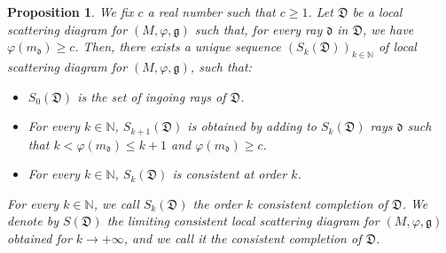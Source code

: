 \documentclass[12pt, a4paper]{amsart}
\newtheorem{prop}[defn]{Proposition}
\newcommand\NN{\mathbb N}
\newcommand\fd{\mathfrak d}
\newcommand\fD{\mathfrak D}
\newcommand\fg{\mathfrak g}
\begin{document}
\begin{prop} \label{prop_local_consistent_completion}
We fix $c$ a real number such that $c \geqslant 1$.
Let $\fD$ be a local scattering diagram for 
$(M,\varphi,\fg)$ such that, for every ray $\fd$ in $\fD$, we have $\varphi(m_\fd) \geqslant c$. Then, there exists a unique sequence 
$(S_k(\fD))_{k \in \NN}$ of local scattering diagram
for $(M,\varphi,\fg)$,
such that:
\begin{itemize}
\item[(i)] $S_0(\fD)$ is the set of ingoing rays of $\fD$.
\item[(ii)] For every $k \in \NN$, $S_{k+1}(\fD)$ is obtained by adding to $S_k(\fD)$ rays 
$\fd$ such that $k<\varphi(m_\fd) \leqslant k+1$ and $\varphi(m_\fd) \geqslant c$.
\item[(iii)] For every $k \in \NN$, 
$S_k(\fD)$ is consistent at order $k$.
\end{itemize}
For every $k \in \NN$, we call 
$S_k(\fD)$ the order $k$ 
\emph{consistent completion} of $\fD$. We denote by $S(\fD)$ the limiting consistent local scattering diagram for
$(M,\varphi,\fg)$
obtained for $k \rightarrow +\infty$, and we call it the \emph{consistent completion} of $\fD$.
\end{prop}
\end{document}

